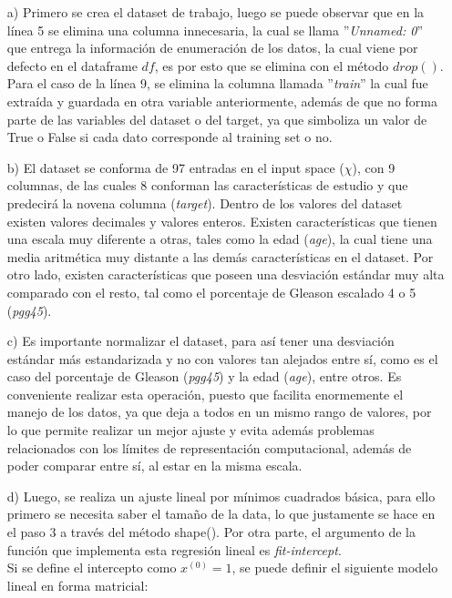 \documentclass[10pt]{article}
\begin{document}
\begin{itemize}
\item[a)] Primero se crea el dataset de trabajo, luego se puede observar que en la línea 5 se elimina una columna innecesaria, la cual se llama ''\textit{Unnamed: 0}'' que entrega la información de enumeración de los datos, la cual viene por defecto en el dataframe $df$, es por esto que se elimina con el método $drop()$. Para el caso de la línea 9, se elimina la columna llamada ''\textit{train}'' la cual fue extraída y guardada en otra variable anteriormente, además de que no forma parte de las variables del dataset o del target, ya que simboliza un valor de True o False si cada dato corresponde al training set o no.

\item[b)] El dataset se conforma de 97 entradas en el input space ($\chi$), con 9 columnas, de las cuales 8 conforman las características de estudio y que predecirá la novena columna (\textit{target}). Dentro de los valores del dataset existen valores decimales y valores enteros. Existen características que tienen una escala muy diferente a otras, tales como la edad (\textit{age}), la cual tiene una media aritmética muy distante a las demás características en el dataset. Por otro lado, existen características que poseen una desviación estándar muy alta comparado con el resto, tal como el porcentaje de Gleason escalado 4 o 5 (\textit{pgg45}).

\item[c)] Es importante normalizar el dataset, para así tener una desviación estándar más estandarizada y no con valores tan alejados entre sí, como es el caso del porcentaje de Gleason (\textit{pgg45}) y la edad (\textit{age}), entre otros. Es conveniente realizar esta operación, puesto que facilita enormemente el manejo de los datos, ya que deja a todos en un mismo rango de valores, por lo que permite realizar un mejor ajuste y evita además problemas relacionados con los límites de representación computacional, además de poder comparar entre sí, al estar en la misma escala.

\item[d)] Luego, se realiza un ajuste lineal por mínimos cuadrados básica, para ello primero se necesita saber el tamaño de la data, lo que justamente se hace en el paso $3$ a través del método shape(). Por otra parte, el argumento de la función que implementa esta regresión lineal es \textit{fit-intercept}.\\

Si se define el intercepto como $x^{(0)} = 1$, se puede definir el siguiente modelo lineal en forma matricial:\\


\end{itemize}
\end{document}
